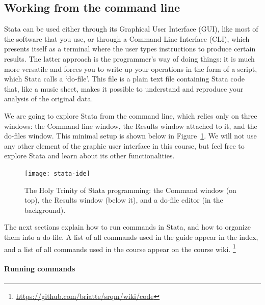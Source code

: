 \subsection{Working from the command line} %
  \label{sec:cli}
%
%
Stata can be used either through its Graphical User Interface (GUI), like most of the software that you use, or through a Command Line Interface (CLI), which presents itself as a terminal where the user types instructions to produce certain results. The latter approach is the programmer's way of doing things: it is much more versatile and forces you to write up your operations in the form of a script, which Stata calls a `do-file'. This file is a plain text file containing Stata code that, like a music sheet, makes it possible to understand and reproduce your analysis of the original data.%

We are going to explore Stata from the command line, which relies only on three windows: the Command line window, the Results window attached to it, and the do-files window. This minimal setup is shown below in Figure~\ref{fig:stata-ide}. We will not use any other element of the graphic user interface in this course, but feel free to explore Stata and learn about its other functionalities.%

\begin{figure}
	\texttt{[image: stata-ide]}%
	\caption{The Holy Trinity of Stata programming: the Command window (on top), the Results window (below it), and a do-file editor (in the background).}%
	\label{fig:stata-ide}%
\end{figure}



The next sections explain how to run commands in Stata, and how to organize them into a do-file. A list of all commands used in the guide appear in the index, and a list of all commands used in the course appear on the course wiki.%
	\footnote{\url{https://github.com/briatte/srqm/wiki/code}}%

	\paragraph{Running commands}
  
